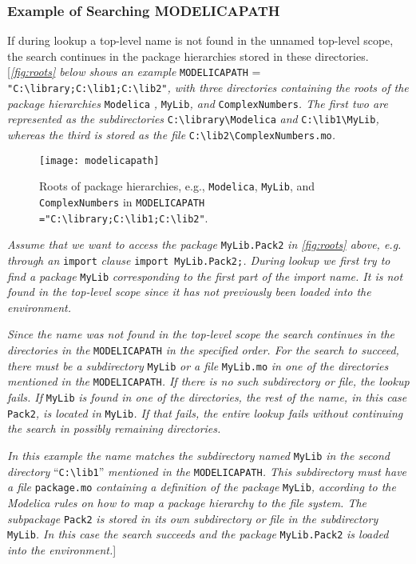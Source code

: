 \subsubsection{Example of Searching MODELICAPATH}

If during lookup a top-level name is not found in the unnamed top-level
scope, the search continues in the package hierarchies stored in these
directories. {[}\emph{\autoref{fig:roots} below shows an example} \lstinline!MODELICAPATH! =
\lstinline!"C:\library;C:\lib1;C:\lib2"!\emph{,
with three directories containing the roots of the package hierarchies}
\lstinline!Modelica! \emph{,} \lstinline!MyLib!\emph{, and} \lstinline!ComplexNumbers!\emph{. The first two are represented as the subdirectories} \lstinline!C:\library\Modelica! \emph{and}
\lstinline!C:\lib1\MyLib!\emph{, whereas the third is stored
as the file} \lstinline!C:\lib2\ComplexNumbers.mo!\emph{.}

\begin{figure}[H]
\caption{Roots of package hierarchies, e.g.,
\texttt{Modelica}, \texttt{MyLib}, and \texttt{ComplexNumbers} in
\texttt{MODELICAPATH ="C:\textbackslash library;C:\textbackslash lib1;C:\textbackslash lib2"}.}
\label{fig:roots}
\texttt{[image: modelicapath]}
\end{figure}

\emph{Assume that we want to access the package} \lstinline!MyLib.Pack2! \emph{in
\autoref{fig:roots} above, e.g. through an} \lstinline!import! \emph{clause} 
\lstinline!import MyLib.Pack2;!\emph{. During lookup we first try to find a package} \lstinline!MyLib!
\emph{corresponding to the first part of the import name. It is not
found in the top-level scope since it has not previously been loaded
into the environment. }

\emph{Since the name was not found in the top-level scope the search
continues in the directories in the} \lstinline!MODELICAPATH! \emph{in the specified
order. For the search to succeed, there must be a subdirectory} \lstinline!MyLib!
\emph{or a file} \lstinline!MyLib.mo! \emph{in one of the directories mentioned in
the} \lstinline!MODELICAPATH!\emph{. If there is no such subdirectory or file, the
lookup fails. If} \lstinline!MyLib! \emph{is found in one of the directories, the
rest of the name, in this case} \lstinline!Pack2!\emph{, is located in} \lstinline!MyLib!\emph{.
If that fails, the entire lookup fails without continuing the search in
possibly remaining directories.}

\emph{In this example the name matches the subdirectory named} \lstinline!MyLib!
\emph{in the second directory} ``\lstinline!C:\lib1!''
\emph{mentioned in the} \lstinline!MODELICAPATH!\emph{. This subdirectory must have
a file} \lstinline!package.mo! \emph{containing a definition of the package}
\lstinline!MyLib!\emph{, according to the Modelica rules on how to map a package
hierarchy to the file system. The subpackage} \lstinline!Pack2! \emph{is stored in
its own subdirectory or file in the subdirectory} \lstinline!MyLib!\emph{. In this
case the search succeeds and the package} \lstinline!MyLib.Pack2! \emph{is loaded
into the environment.}{]}
